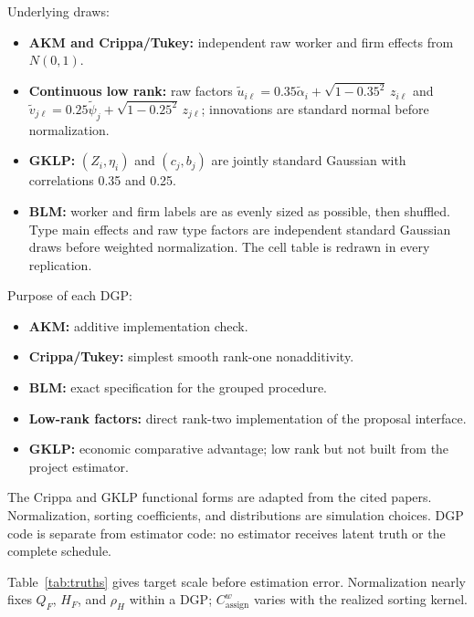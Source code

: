 \documentclass[11pt]{article}
\newcommand{\QF}{Q_F}
\newcommand{\HF}{H_F}
\newcommand{\rhoH}{\rho_H}
\newcommand{\Cassign}{C^{w}_{\mathrm{assign}}}
\begin{document}
Underlying draws:
\begin{itemize}
\item \textbf{AKM and Crippa/Tukey:} independent raw worker and firm effects
from $N(0,1)$.
\item \textbf{Continuous low rank:} raw factors
$\widetilde u_{i\ell}=0.35\widetilde\alpha_i+
\sqrt{1-0.35^2}\,z_{i\ell}$ and
$\widetilde v_{j\ell}=0.25\widetilde\psi_j+
\sqrt{1-0.25^2}\,z_{j\ell}$; innovations are standard normal before
normalization.
\item \textbf{GKLP:} $(Z_i,\eta_i)$ and $(c_j,b_j)$ are jointly standard
Gaussian with correlations 0.35 and 0.25.
\item \textbf{BLM:} worker and firm labels are as evenly sized as possible,
then shuffled.  Type main effects and raw type factors are independent
standard Gaussian draws before weighted normalization.  The cell table is
redrawn in every replication.
\end{itemize}

Purpose of each DGP:
\begin{itemize}
\item \textbf{AKM:} additive implementation check.
\item \textbf{Crippa/Tukey:} simplest smooth rank-one nonadditivity.
\item \textbf{BLM:} exact specification for the grouped procedure.
\item \textbf{Low-rank factors:} direct rank-two implementation of the
proposal interface.
\item \textbf{GKLP:} economic comparative advantage; low rank but not built
from the project estimator.
\end{itemize}

The Crippa and GKLP functional forms are adapted from the cited papers.
Normalization, sorting coefficients, and distributions are simulation choices.
DGP code is separate from estimator code: no estimator receives latent truth
or the complete schedule.

Table~\ref{tab:truths} gives target scale before estimation error.
Normalization nearly fixes $\QF$, $\HF$, and $\rhoH$ within a DGP; $\Cassign$
varies with the realized sorting kernel.

\begin{table}[H]
\centering
\caption{Mean exact finite-population proposal truths across 100 replications}
\label{tab:truths}

\end{table}
\end{document}
